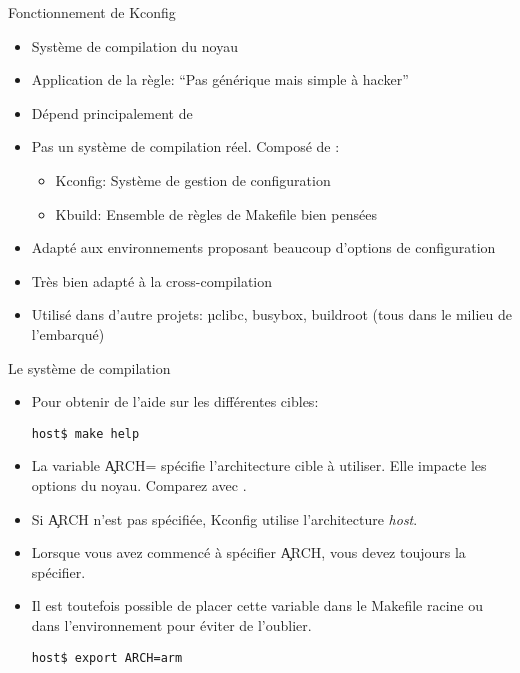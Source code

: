 \begin{frame}[fragile=singleslide]{Fonctionnement de Kconfig}
  \begin{itemize}
  \item Système de compilation du noyau
  \item Application de la règle: ``Pas générique mais simple à hacker''
  \item Dépend principalement de 
  \item  Pas un  système de  compilation réel. Composé de :
    \begin{itemize}
    \item Kconfig: Système de gestion de configuration
    \item Kbuild: Ensemble de règles de Makefile bien pensées
    \end{itemize}
  \item  Adapté  aux environnements  proposant  beaucoup d'options  de
    configuration
  \item Très bien adapté à la cross-compilation
  \item Utilisé dans d'autre projets: µclibc, busybox, buildroot (tous
    dans le milieu de l'embarqué)
\end{itemize}
\end{frame} 

\begin{frame}[fragile=singleslide]{Le système de compilation}
\begin{itemize} 
  \item Pour obtenir de l'aide sur les différentes cibles:
    \begin{lstlisting}
host$ make help
    \end{lstlisting} 
  \item  La   variable  \c{ARCH=}  spécifie   l'architecture  cible  à
    utiliser.   Elle   impacte  les   options   du  noyau.    Comparez
     avec .
  \item   Si   \c{ARCH}   n'est   pas   spécifiée,   Kconfig   utilise
    l'architecture \emph{host}.
  \item Lorsque  vous avez commencé  à spécifier \c{ARCH},  vous devez
    toujours la  spécifier. 
  \item Il  est toutefois  possible de placer  cette variable  dans le
    Makefile racine ou dans l'environnement pour éviter de l'oublier.
    \begin{lstlisting}
host$ export ARCH=arm 
    \end{lstlisting} 
  \end{itemize} 
\end{frame} 

